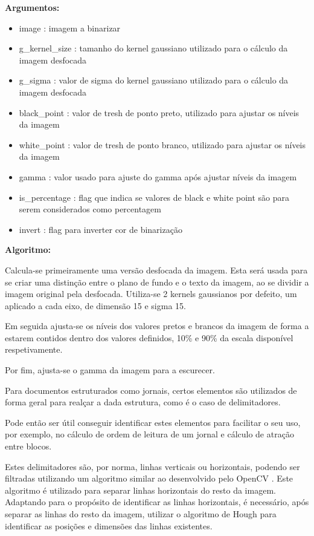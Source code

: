 \textbf{Argumentos:}
\begin{itemize}\setlength\itemsep{-0.3em}
	\item image : imagem a binarizar
	\item g\_kernel\_size : tamanho do kernel gaussiano utilizado para o cálculo da imagem desfocada
	\item g\_sigma : valor de sigma do kernel gaussiano utilizado para o cálculo da imagem desfocada
	\item black\_point : valor de tresh de ponto preto, utilizado para ajustar os níveis da imagem
	\item white\_point : valor de tresh de ponto branco, utilizado para ajustar os níveis da imagem 
	\item gamma : valor usado para ajuste do gamma após ajustar níveis da imagem
	\item is\_percentage : flag que indica se valores de black e white point são para serem considerados como percentagem
	\item invert : flag para inverter cor de binarização
\end{itemize}

\textbf{Algoritmo:}

Calcula-se primeiramente uma versão desfocada da imagem. Esta será usada para se criar uma distinção entre o plano de fundo e o texto da imagem, ao se dividir a imagem original pela desfocada. Utiliza-se 2 kernels gaussianos por defeito, um aplicado a cada eixo, de dimensão 15 e sigma 15.

Em seguida ajusta-se os níveis dos valores pretos e brancos da imagem de forma a estarem contidos dentro dos valores definidos, 10\% e 90\% da escala disponível respetivamente. 

Por fim, ajusta-se o gamma da imagem para a escurecer.


\label{contribution_image_delimiter_identification}

Para documentos estruturados como jornais, certos elementos são utilizados de forma geral para realçar a dada estrutura, como é o caso de delimitadores.


Pode então ser útil conseguir identificar estes elementos para facilitar o seu uso, por exemplo, no cálculo de ordem de leitura de um jornal e cálculo de atração entre blocos.

Estes delimitadores são, por norma, linhas verticais ou horizontais, podendo ser filtradas utilizando um algoritmo similar ao desenvolvido pelo OpenCV \citep{cv_extract_lines}. Este algoritmo é utilizado para separar linhas horizontais do resto da imagem. Adaptando para o propósito de identificar as linhas horizontais, é necessário, após separar as linhas do resto da imagem, utilizar o algoritmo de Hough para identificar as posições e dimensões das linhas existentes.

